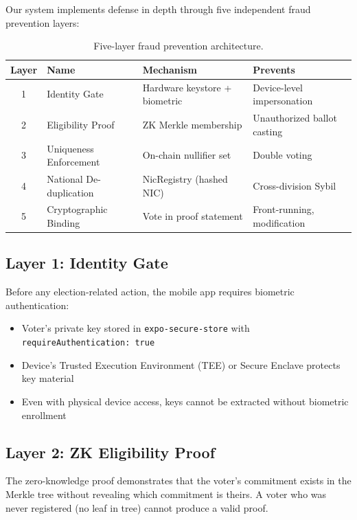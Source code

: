 Our system implements defense in depth through five independent fraud prevention layers:

\begin{table}[H]
\centering
\caption{Five-layer fraud prevention architecture.}
\label{tab:fraud-layers}
\begin{tabular}{|c|l|p{4cm}|p{4cm}|}
\hline
\textbf{Layer} & \textbf{Name} & \textbf{Mechanism} & \textbf{Prevents} \\
\hline
1 & Identity Gate & Hardware keystore + biometric & Device-level impersonation \\
\hline
2 & Eligibility Proof & ZK Merkle membership & Unauthorized ballot casting \\
\hline
3 & Uniqueness Enforcement & On-chain nullifier set & Double voting \\
\hline
4 & National De-duplication & NicRegistry (hashed NIC) & Cross-division Sybil \\
\hline
5 & Cryptographic Binding & Vote in proof statement & Front-running, modification \\
\hline
\end{tabular}
\end{table}

\subsection{Layer 1: Identity Gate}

Before any election-related action, the mobile app requires biometric authentication:
\begin{itemize}
    \item Voter's private key stored in \texttt{expo-secure-store} with \texttt{requireAuthentication: true}
    \item Device's Trusted Execution Environment (TEE) or Secure Enclave protects key material
    \item Even with physical device access, keys cannot be extracted without biometric enrollment
\end{itemize}

\subsection{Layer 2: ZK Eligibility Proof}

The zero-knowledge proof demonstrates that the voter's commitment exists in the Merkle tree without revealing which commitment is theirs. A voter who was never registered (no leaf in tree) cannot produce a valid proof.

